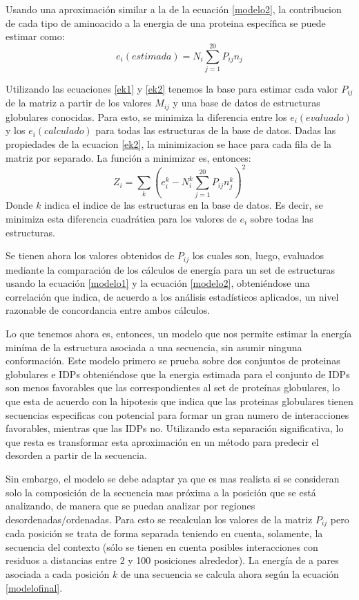 Usando una aproximación similar a la de la ecuación \ref{modelo2}, la contribucion de cada tipo de aminoacido a la energia de una proteina específica se puede estimar como:
\begin{equation}\label{ek2}
e_i(estimada) = N_i\sum_{j=1}^{20} P_{ij}n_{j}
\end{equation}

Utilizando las ecuaciones \ref{ek1} y \ref{ek2} tenemos la base para estimar cada valor $P_{ij}$ de la matriz a partir de los valores $M_{ij}$ y una base de datos de estructuras globulares conocidas.
Para esto, se minimiza la diferencia entre los $e_i(evaluado)$ y los $e_i(calculado)$ para todas las estructuras de la base de datos.
Dadas las propiedades de la ecuacion \ref{ek2}, la minimizacion se hace para cada fila de la matriz por separado.
La función a minimizar es, entonces: 
\begin{equation}\label{z}
Z_i = \sum_{k} (e_i^k - N_i^k\sum_{j=1}^{20} P_{ij}n_{j}^k)^2   
\end{equation}
Donde $k$ indica el indice de las estructuras en la base de datos. Es decir, se minimiza esta diferencia cuadrática para los valores de $e_i$ sobre todas las estructuras.

Se tienen ahora los valores obtenidos de $P_{ij}$ los cuales son, luego, evaluados mediante la comparación de los cálculos de energía para un set de estructuras usando la ecuación \ref{modelo1} y la ecuación \ref{modelo2}, 
obteniéndose una correlación que indica, de acuerdo a los análisis estadísticos aplicados, un nivel razonable de concordancia entre ambos cálculos.

Lo que tenemos ahora es, entonces, un modelo que nos permite estimar la energía miníma de la estructura asociada a una secuencia, sin asumir ninguna conformación.
Este modelo primero se prueba sobre dos conjuntos de proteinas globulares e IDPs obteniéndose que la energia estimada para el conjunto de IDPs son menos favorables que las correspondientes al set de proteínas globulares,
lo que esta de acuerdo con la hipotesis que indica que las proteinas globulares tienen secuencias especificas con potencial para formar un gran numero de interacciones favorables, mientras que las IDPs no.
Utilizando esta separación significativa, lo que resta es transformar esta aproximación en un método para predecir el desorden a partir de la secuencia.

Sin embargo, el modelo se debe adaptar ya que es mas realista si se consideran solo la composición de la secuencia mas próxima a la posición que se está analizando, de manera que se puedan analizar por regiones desordenadas/ordenadas.
Para esto se recalculan los valores de la matriz $P_{ij}$ pero cada posición se trata de forma separada teniendo en cuenta, solamente, la secuencia del contexto
(sólo se tienen en cuenta posibles interacciones con residuos a distancias entre 2 y 100 posiciones alrededor).
La energía de a pares asociada a cada posición $k$ de una secuencia se calcula ahora según la ecuación \ref{modelofinal}.


